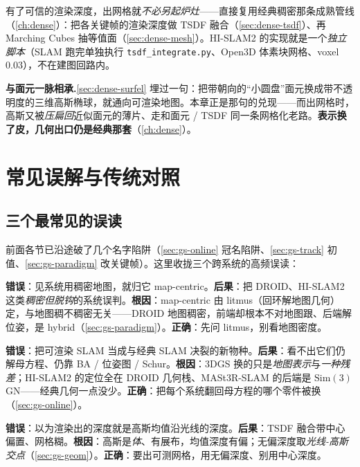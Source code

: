 有了可信的渲染深度，出网格就\emph{不必另起炉灶}——直接复用经典稠密那条成熟管线（\cref{ch:dense}）：把各关键帧的渲染深度做 TSDF 融合（\cref{sec:dense-tsdf}）、再 Marching Cubes 抽等值面（\cref{sec:dense-mesh}）。HI-SLAM2 的实现就是一个\emph{独立脚本}（SLAM 跑完单独执行 \texttt{tsdf\_integrate.py}、Open3D 体素块网格、voxel $0.03$），不在建图回路内。

\begin{note}
\textbf{与面元一脉相承.}\;\cref{sec:dense-surfel} 埋过一句：把带朝向的“小圆盘”面元换成带不透明度的三维高斯椭球，就通向可渲染地图。本章正是那句的兑现——而出网格时，高斯又被\emph{压扁回}近似面元的薄片、走和面元 / TSDF 同一条网格化老路。\textbf{表示换了皮，几何出口仍是经典那套}（\cref{ch:dense}）。
\end{note}

\section{常见误解与传统对照}
\label{sec:gs-pitfalls}

\subsection{三个最常见的误读}

前面各节已沿途破了几个名字陷阱（\cref{sec:gs-online} 冠名陷阱、\cref{sec:gs-track} 初值、\cref{sec:gs-paradigm} 改关键帧）。这里收拢三个跨系统的高频误读：

\begin{pitfall}
\textbf{错误}：见系统用稠密地图，就归它 map-centric。\textbf{后果}：把 DROID、HI-SLAM2 这类\emph{稠密但脱钩}的系统误判。\textbf{根因}：map-centric 由 litmus（回环解地图几何）定，与地图稠不稠密无关——DROID 地图稠密，前端却根本不对地图跟、后端解位姿，是 hybrid（\cref{sec:gs-paradigm}）。\textbf{正确}：先问 litmus，别看地图密度。
\end{pitfall}

\begin{pitfall}
\textbf{错误}：把可渲染 SLAM 当成与经典 SLAM 决裂的新物种。\textbf{后果}：看不出它们仍解母方程、仍靠 BA / 位姿图 / Schur。\textbf{根因}：3DGS 换的只是\emph{地图表示}与\emph{一种残差}；HI-SLAM2 的定位全在 DROID 几何栈、MASt3R-SLAM 的后端是 $\mathrm{Sim}(3)$ GN——经典几何一点没少。\textbf{正确}：把每个系统翻回母方程的哪个零件被换（\cref{sec:gs-online}）。
\end{pitfall}

\begin{pitfall}[“渲染深度 $=$ 高斯中心深度”]
\textbf{错误}：以为渲染出的深度就是高斯均值沿光线的深度。\textbf{后果}：TSDF 融合带中心偏置、网格糊。\textbf{根因}：高斯是\emph{体}、有展布，均值深度有偏；无偏深度取\emph{光线-高斯交点}（\cref{sec:gs-geom}）。\textbf{正确}：要出可测网格，用无偏深度、别用中心深度。
\end{pitfall}

